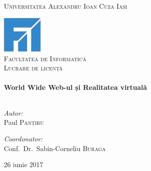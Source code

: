 \begin{titlepage}

\begin{center}

\textsc{\Large Universitatea Alexandru Ioan Cuza Iași}

\vfill

\includegraphics[width=0.15\textwidth]{./img/logo_fii.png}\\[1cm]


\textsc{\LARGE Facultatea de Informatică}\\[1.5cm]


\textsc{\Large Lucrare de licență}\\[0.5cm]


\HRule \\[0.4cm]
{ \huge \bfseries World Wide Web-ul și Realitatea virtuală }\\[0.4cm]

\HRule \\[1.5cm]

\begin{minipage}{0.3\textwidth}
\begin{flushleft} \large
\emph{Autor:}\\
Paul \textsc{Panțiru}
\end{flushleft}
\end{minipage}
\begin{minipage}{0.6\textwidth}
\begin{flushright} \large
\emph{Coordonator:} \\
Conf.\ Dr.\ Sabin-Corneliu \textsc{Buraga}
\end{flushright}
\end{minipage}

\vfill

{\large 26 iunie 2017}

\end{center}

\newpage
\thispagestyle{empty}
\mbox{}

\end{titlepage}

